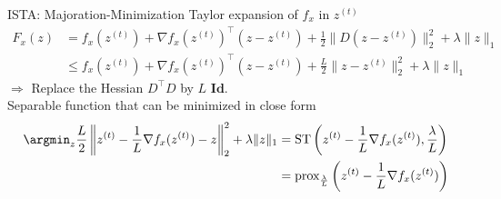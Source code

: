 \documentclass{beamer}
\begin{document}
\appendix


\begin{frame}[t]{ISTA: Majoration-Minimization}
    Taylor expansion of $f_x$ in $z^{(t)}$
    \begin{align*}
        F_x(z) &  = f_x(z^{(t)}) + \nabla f_x(z^{(t)})^\top(z - z^{(t)})
                    + \frac{1}{2}\|D(z-z^{(t)})\|_2^2+ \lambda\|z\|_1\\
               & \le f_x(z^{(t)}) + \nabla f_x(z^{(t)})^\top(z - z^{(t)}) + \frac{L}{2}\|z - z^{(t)}\|_2^2 + \lambda\|z\|_1
    \end{align*}
    $\Rightarrow$ Replace the Hessian $D^\top D$ by $L \textbf{ Id}$.\\[2em]

    Separable function that can be minimized in close form
    \begin{align*}
        \argmin_z \frac{L}{2}\left\|z^{(t)} - \frac{1}{L}\nabla f_x(z^{(t)}) - z\right\|_2^2 + \lambda\|z\|_1
        & = \text{ST}\left(z^{(t)} - \frac{1}{L}\nabla f_x(z^{(t)}),
                           \frac{\lambda}{L}\right)\\
        & = \text{prox}_{\frac{\lambda}{L}}\left(z^{(t)} - \frac{1}{L}\nabla f_x(z^{(t)})\right)
    \end{align*}
\end{frame}
\end{document}
